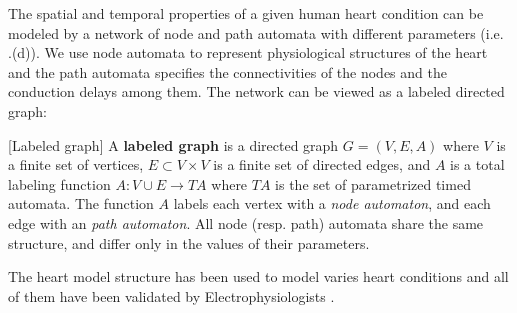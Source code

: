 %
The spatial and temporal properties of a given human heart condition can be modeled by a network of node and path automata with different parameters (i.e. .(d)). We use node automata to represent physiological structures of the heart and the path automata specifies the connectivities of the nodes and the conduction delays among them. The network can be viewed as a labeled directed graph: %
\begin{defn}
	\label{def:labeledGraph}
	[Labeled graph]
	A \textbf{labeled graph} is a directed graph $G = (V,E,A)$ where 
	$V$ is a finite set of vertices, $E \subset V\times V$ is a finite set of directed edges,
	and $A$ is a total labeling function $A: V \cup E \rightarrow TA$
	where $TA$ is the set of parametrized timed automata.
	The function $A$ labels each vertex with a \emph{node automaton}, and each edge with an \emph{path automaton}.
	All node (resp. path) automata share the same structure, and differ only in the values of their parameters.
\end{defn}
The heart model structure has been used to model varies heart conditions and all of them have been validated by Electrophysiologists \cite{vhm_ecrts10,vhm_embc10}.

